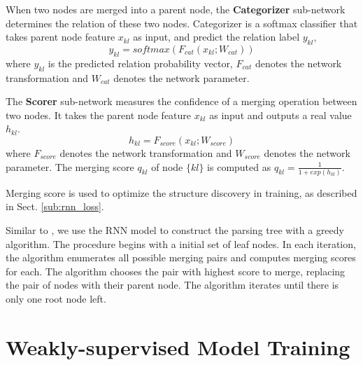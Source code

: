 \documentclass[10pt,twocolumn,letterpaper]{article}
\begin{document}
When two nodes are merged into a parent node, the \textbf{Categorizer} sub-network determines the relation of these two nodes. Categorizer is a softmax classifier that takes parent node feature $x_{kl}$ as input, and predict the relation label $y_{kl}$,
\begin{equation}\label{eq_rel_category}
y_{kl} = softmax(F_{cat}(x_{kl};W_{cat}))
\end{equation}
where $y_{kl}$ is the predicted relation probability vector, $F_{cat}$ denotes the network transformation and $W_{cat}$ denotes the network parameter.

The \textbf{Scorer} sub-network measures the confidence of a merging operation between two nodes. It takes the parent node feature $x_{kl}$ as input and outputs a real value $h_{kl}$.
\vspace{-1mm}
\begin{equation}\label{eq_node_score}
h_{kl} = F_{score}(x_{kl};W_{score})
\end{equation}
where $F_{score}$ denotes the network transformation and $W_{score}$ denotes the network parameter. The merging score $q_{kl}$ of node $\{kl\}$ is computed as $q_{kl} = \frac{1}{1+exp(h_{kl})}$.

Merging score is used to optimize the structure discovery in training, as described in Sect. \ref{sub:rnn_loss}.

Similar to \cite{DBLP:Recursive_Socher}, we use the RNN model to construct the parsing tree with a greedy algorithm. The procedure begins with a initial set of leaf nodes. In each iteration, the algorithm enumerates all possible merging pairs and computes merging scores for each. The algorithm chooses the pair with highest score to merge, replacing the pair of nodes with their parent node. The algorithm iterates until there is only one root node left.




























\section{Weakly-supervised Model Training}
\end{document}
